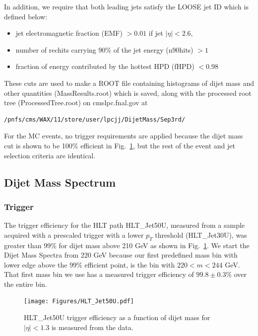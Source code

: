 In addition, we require that both leading jets satisfy the LOOSE jet ID which is defined below:
\begin{itemize}
\item jet electromagnetic fraction (EMF) $> 0.01$ if jet $|\eta|<2.6$,
\item number of rechits carrying $90\%$ of the jet energy (n90hits) $> 1$
\item fraction of energy contributed by the hottest HPD (fHPD) $< 0.98$
\end{itemize}

These cuts are used to make a ROOT file containing histograms of dijet mass 
and other quantities (MassResults.root)
which is saved, along with the processed root tree (ProcessedTree.root)
on cmslpc.fnal.gov at
\begin{verbatim}
/pnfs/cms/WAX/11/store/user/lpcjj/DijetMass/Sep3rd/
\end{verbatim} 

For the MC events, no trigger requirements are applied because the dijet 
mass cut is shown to be 100\% efficient in Fig.~\ref{Trigger}, but the rest of the event 
and jet selection criteria are identical.

\subsection{Dijet Mass Spectrum}

\subsubsection{Trigger}

The trigger efficiency for the HLT path HLT\_Jet50U, measured from a sample acquired with a prescaled trigger with a lower
$p_T$ threshold (HLT\_Jet30U), was greater than 99\% for dijet mass above 210 GeV as
shown in Fig.~\ref{Trigger}. We start the Dijet Mass Spectra from 220
GeV because our first predefined mass bin with lower edge above the 99\% efficient point,
is the bin with $220<m<244$ GeV. That first mass bin we use has a measured 
trigger efficiency of $99.8\pm0.3$\% over the entire bin.


\begin{figure}[!ht]
  \begin{center}
    \texttt{[image: Figures/HLT\_Jet50U.pdf]}
    \caption{ HLT\_Jet50U trigger efficiency as a function of dijet mass for 
    $|\eta|<1.3$ is measured from the data.}
    \label{Trigger}
  \end{center}
\end{figure}


